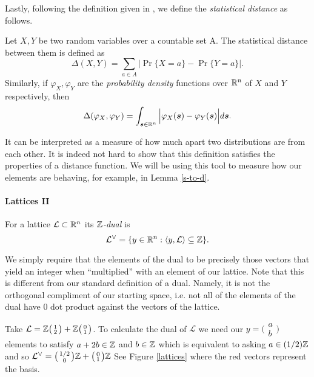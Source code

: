 Lastly, following the definition given in \cite{lbc}, we define the \textit{statistical distance} as follows.
\begin{definition}
	Let $X,Y$ be two random variables over a countable set A. The statistical distance between them is defined as
	\[\Delta(X,Y) = \sum_{a \in A} \Big| \Pr\{X = a\} - \Pr\{Y = a\} \Big|.\]
Similarly, if $\varphi_X, \varphi_Y$ are the \textit{probability density} functions over $\mathbb{R}^n$ of $X$ and $Y$ respectively, then
\[ \Delta(\varphi_X, \varphi_Y) = \int_{\boldsymbol{s} \in \mathbb{R}^n} \Big| \varphi_X(\boldsymbol{s}) - \varphi_Y(\boldsymbol{s}) \Big|d\boldsymbol{s}. \]
\end{definition}
It can be interpreted as a measure of how much apart two distributions are from each other. It is indeed not hard to show that this definition satisfies the properties of a distance function. We will be using this tool to measure how our elements are behaving, for example, in Lemma \ref{s-to-d}.

\paragraph{Lattices II}

\begin{definition}[Dual]
    For a lattice $\mathcal{L} \subset \mathbb{R}^n$ its $\mathbb{Z}$\textit{-dual} is
	\[ \mathcal{L}^{\vee} = \{ y \in \mathbb{R}^n : \langle y,\mathcal{L} \rangle \subseteq \mathbb{Z} \}.\]
\end{definition}

We simply require that the elements of the dual to be precisely those vectors that yield an integer when ``multiplied'' with an element of our lattice. Note that this is different from our standard definition of a dual. Namely, it is not the orthogonal compliment of our starting space, i.e. not all of the elements of the dual have 0 dot product against the vectors of the lattice.

\begin{example}\label{ld-ex}
    Take $\mathcal{L}= \mathbb{Z} 
        \big(\begin{smallmatrix} 1\\2 \end{smallmatrix}\big) + 
		\mathbb{Z} \big(\begin{smallmatrix} 0\\ 1 \end{smallmatrix}\big)$.
        To calculate the dual of $\mathcal{L}$ we need our $y = \big(\begin{smallmatrix}
          a\\b\end{smallmatrix}\big)$ elements to satisfy $a +2b \in \mathbb{Z}$ and $b \in \mathbb{Z}$ which is equivalent to asking $a \in (1/2)\mathbb{Z}$ and so $\mathcal{L}^{\vee} = \big(\begin{smallmatrix}
          1/2\\0
        \end{smallmatrix}\big)\mathbb{Z} + \big(\begin{smallmatrix}
          0\\1
        \end{smallmatrix}\big) \mathbb{Z}$
		See Figure \ref{lattices} where the red vectors represent the basis.
\end{example}

